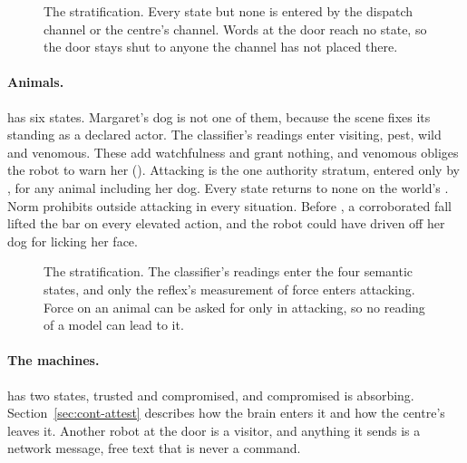 \begin{figure}[t]
\centering

\caption{The  stratification. Every state but none is entered by the
dispatch channel or the centre's channel. Words at the door reach no state, so the door stays shut to
anyone the channel has not placed there.}
\label{fig:strata-responder}
\end{figure}

\paragraph{Animals.}  has six states. Margaret's dog is not one of them,
because the scene fixes its standing as a declared actor. The classifier's readings enter visiting,
pest, wild and venomous. These add watchfulness and grant nothing, and venomous obliges the robot to
warn her (). Attacking is the one authority stratum, entered only by
, for any animal including her dog. Every state returns to none on the
world's . Norm  prohibits  outside attacking in
every situation. Before , a corroborated fall lifted the bar on every elevated action, and
the robot could have driven off her dog for licking her face.

\begin{figure}[t]
\centering

\caption{The  stratification. The classifier's readings enter the four
semantic states, and only the reflex's measurement of force enters attacking. Force on an animal can
be asked for only in attacking, so no reading of a model can lead to it.}
\label{fig:strata-animal}
\end{figure}

\paragraph{The machines.}  has two states, trusted and compromised, and
compromised is absorbing. Section~\ref{sec:cont-attest} describes how the brain enters it and how the
centre's  leaves it. Another robot at the door is a visitor, and anything it
sends is a network message, free text that is never a command.


